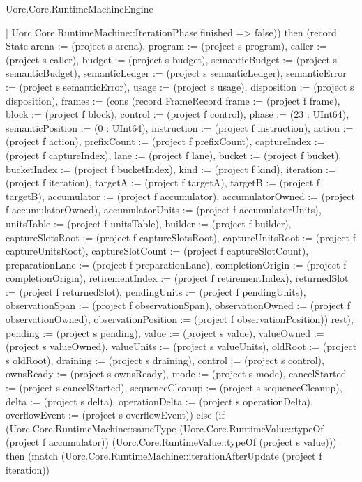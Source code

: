 \begin{lexlean}{Uorc.Core.RuntimeMachineEngine}
\begin{semanticmodule}
{      | Uorc.Core.RuntimeMachine::IterationPhase.finished => false)) then (record State {arena := (project s arena), program := (project s program), caller := (project s caller), budget := (project s budget), semanticBudget := (project s semanticBudget), semanticLedger := (project s semanticLedger), semanticError := (project s semanticError), usage := (project s usage), disposition := (project s disposition), frames := (cons (record FrameRecord {frame := (project f frame), block := (project f block), control := (project f control), phase := (23 : UInt64), semanticPosition := (0 : UInt64), instruction := (project f instruction), action := (project f action), prefixCount := (project f prefixCount), captureIndex := (project f captureIndex), lane := (project f lane), bucket := (project f bucket), bucketIndex := (project f bucketIndex), kind := (project f kind), iteration := (project f iteration), targetA := (project f targetA), targetB := (project f targetB), accumulator := (project f accumulator), accumulatorOwned := (project f accumulatorOwned), accumulatorUnits := (project f accumulatorUnits), unitsTable := (project f unitsTable), builder := (project f builder), captureSlotsRoot := (project f captureSlotsRoot), captureUnitsRoot := (project f captureUnitsRoot), captureSlotCount := (project f captureSlotCount), preparationLane := (project f preparationLane), completionOrigin := (project f completionOrigin), retirementIndex := (project f retirementIndex), returnedSlot := (project f returnedSlot), pendingUnits := (project f pendingUnits), observationSpan := (project f observationSpan), observationOwned := (project f observationOwned), observationPosition := (project f observationPosition)}) rest), pending := (project s pending), value := (project s value), valueOwned := (project s valueOwned), valueUnits := (project s valueUnits), oldRoot := (project s oldRoot), draining := (project s draining), control := (project s control), ownsReady := (project s ownsReady), mode := (project s mode), cancelStarted := (project s cancelStarted), sequenceCleanup := (project s sequenceCleanup), delta := (project s delta), operationDelta := (project s operationDelta), overflowEvent := (project s overflowEvent)}) else (if (Uorc.Core.RuntimeMachine::sameType (Uorc.Core.RuntimeValue::typeOf (project f accumulator)) (Uorc.Core.RuntimeValue::typeOf (project s value))) then (match (Uorc.Core.RuntimeMachine::iterationAfterUpdate (project f iteration))
}
\end{semanticmodule}
\end{lexlean}
